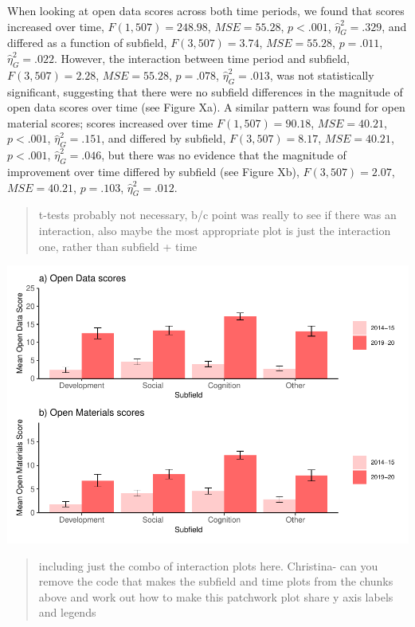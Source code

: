 \documentclass[
  english,
  man]{apa6}
\begin{document}
When looking at open data scores across both time periods, we found that scores increased over time, \(F(1, 507) = 248.98\), \(\mathit{MSE} = 55.28\), \(p < .001\), \(\hat{\eta}^2_G = .329\), and differed as a function of subfield, \(F(3, 507) = 3.74\), \(\mathit{MSE} = 55.28\), \(p = .011\), \(\hat{\eta}^2_G = .022\). However, the interaction between time period and subfield, \(F(3, 507) = 2.28\), \(\mathit{MSE} = 55.28\), \(p = .078\), \(\hat{\eta}^2_G = .013\), was not statistically significant, suggesting that there were no subfield differences in the magnitude of open data scores over time (see Figure Xa). A similar pattern was found for open material scores; scores increased over time \(F(1, 507) = 90.18\), \(\mathit{MSE} = 40.21\), \(p < .001\), \(\hat{\eta}^2_G = .151\), and differed by subfield, \(F(3, 507) = 8.17\), \(\mathit{MSE} = 40.21\), \(p < .001\), \(\hat{\eta}^2_G = .046\), but there was no evidence that the magnitude of improvement over time differed by subfield (see Figure Xb), \(F(3, 507) = 2.07\), \(\mathit{MSE} = 40.21\), \(p = .103\), \(\hat{\eta}^2_G = .012\).

\begin{quote}
t-tests probably not necessary, b/c point was really to see if there was an interaction, also maybe the most appropriate plot is just the interaction one, rather than subfield + time
\end{quote}

\includegraphics{icd_special_issue_files/figure-latex/AB-m-plot-1.pdf}

\begin{quote}
including just the combo of interaction plots here. Christina- can you remove the code that makes the subfield and time plots from the chunks above and work out how to make this patchwork plot share y axis labels and legends
\end{quote}
\end{document}
